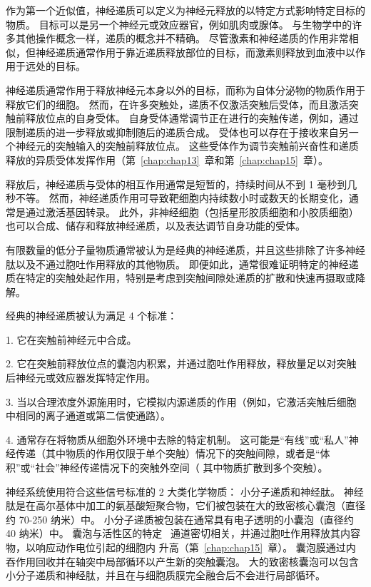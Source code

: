作为第一个近似值，神经递质可以定义为神经元释放的以特定方式影响特定目标的物质。
目标可以是另一个神经元或效应器官，例如肌肉或腺体。 
与生物学中的许多其他操作概念一样，递质的概念并不精确。
尽管激素和神经递质的作用非常相似，但神经递质通常作用于靠近递质释放部位的目标，而激素则释放到血液中以作用于远处的目标。


神经递质通常作用于释放神经元本身以外的目标，而称为自体分泌物的物质作用于释放它们的细胞。
然而，在许多突触处，递质不仅激活突触后受体，而且激活突触前释放位点的自身受体。
自身受体通常调节正在进行的突触传递，例如，通过限制递质的进一步释放或抑制随后的递质合成。
受体也可以存在于接收来自另一个神经元的突触输入的突触前释放位点。
这些受体作为调节突触前兴奋性和递质释放的异质受体发挥作用（第~\ref{chap:chap13}~章和第~\ref{chap:chap15}~章）。


释放后，神经递质与受体的相互作用通常是短暂的，持续时间从不到 1 毫秒到几秒不等。
然而，神经递质作用可导致靶细胞内持续数小时或数天的长期变化，通常是通过激活基因转录。
此外，非神经细胞（包括星形胶质细胞和小胶质细胞）也可以合成、储存和释放神经递质，以及表达调节自身功能的受体。


有限数量的低分子量物质通常被认为是经典的神经递质，并且这些排除了许多神经肽以及不通过胞吐作用释放的其他物质。
即便如此，通常很难证明特定的神经递质在特定的突触处起作用，特别是考虑到突触间隙处递质的扩散和快速再摄取或降解。


经典的神经递质被认为满足 4 个标准：

1. 它在突触前神经元中合成。

2. 它在突触前释放位点的囊泡内积累，并通过胞吐作用释放，释放量足以对突触后神经元或效应器发挥特定作用。

3. 当以合理浓度外源施用时，它模拟内源递质的作用（例如，它激活突触后细胞中相同的离子通道或第二信使通路）。

4. 通常存在将物质从细胞外环境中去除的特定机制。
这可能是“有线”或“私人”神经传递（其中物质的作用仅限于单个突触）情况下的突触间隙，或者是“体积”或“社会”神经传递情况下的突触外空间（ 其中物质扩散到多个突触）。


神经系统使用符合这些信号标准的 2 大类化学物质：
小分子递质和神经肽。
神经肽是在高尔基体中加工的氨基酸短聚合物，它们被包装在大的致密核心囊泡（直径约 70-250 纳米）中。
小分子递质被包装在通常具有电子透明的小囊泡（直径约 40 纳米）中。
囊泡与活性区的特定~ 通道密切相关，并通过胞吐作用释放其内容物，以响应动作电位引起的细胞内  升高（第~\ref{chap:chap15}~章）。
囊泡膜通过内吞作用回收并在轴突中局部循环以产生新的突触囊泡。
大的致密核囊泡可以包含小分子递质和神经肽，并且在与细胞质膜完全融合后不会进行局部循环。



